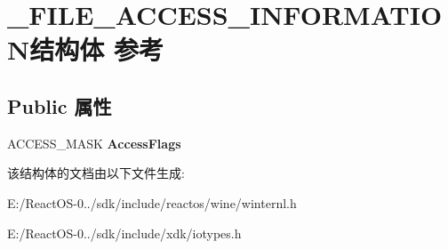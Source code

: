 \hypertarget{struct___f_i_l_e___a_c_c_e_s_s___i_n_f_o_r_m_a_t_i_o_n}{}\section{\+\_\+\+F\+I\+L\+E\+\_\+\+A\+C\+C\+E\+S\+S\+\_\+\+I\+N\+F\+O\+R\+M\+A\+T\+I\+O\+N结构体 参考}
\label{struct___f_i_l_e___a_c_c_e_s_s___i_n_f_o_r_m_a_t_i_o_n}
\subsection*{Public 属性}
\begin{DoxyCompactItemize}
\item 
\mbox{\label{struct___f_i_l_e___a_c_c_e_s_s___i_n_f_o_r_m_a_t_i_o_n_a368ae8c9d3ef29ba77177236cf04900d}} 
A\+C\+C\+E\+S\+S\+\_\+\+M\+A\+SK {\bfseries Access\+Flags}
\end{DoxyCompactItemize}


该结构体的文档由以下文件生成\+:\begin{DoxyCompactItemize}
\item 
E\+:/\+React\+O\+S-\/0../sdk/include/reactos/wine/winternl.\+h\item 
E\+:/\+React\+O\+S-\/0../sdk/include/xdk/iotypes.\+h\end{DoxyCompactItemize}
